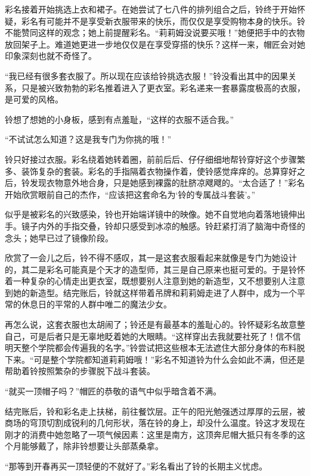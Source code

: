 彩名接着开始挑选上衣和裙子。在她尝试了七八件的排列组合之后，铃终于开始怀疑，彩名有可能并不是享受新衣服带来的快乐，而仅仅是享受购物本身的快乐。铃不能赞同这样的观念；她上前提醒彩名。“莉莉姆没说要买哦！”她便把手中的衣物放回架子上。难道她更进一步地仅仅是在享受穿搭的快乐？这样一来，帽匠会对她印象深刻也就不奇怪了。

“我已经有很多套衣服了。所以现在应该给铃挑选衣服！”铃没看出其中的因果关系，只是被兴致勃勃的彩名推着进入了更衣室。彩名递来一套暴露度极高的衣服，是可爱的风格。

铃想了想她的小身板，感到有点羞耻，“这样的衣服不适合我。”

“不试试怎么知道？这是我专门为你挑的哦！”

铃只好接过衣服。彩名绕着她转着圈，前前后后、仔仔细细地帮铃穿好这个步骤繁多、装饰复杂的套装。彩名的手指隔着衣物操作着，使铃感觉痒痒的。总算穿好之后，铃发现衣物意外地合身，只是她感到裸露的肚脐凉飕飕的。“太合适了！”彩名开始欣赏眼前自己的杰作，“应该把这套命名为‘铃的专属战斗套装’。”

似乎是被彩名的兴致感染，铃也开始端详镜中的映像。她不自觉地向着落地镜伸出手。镜子内外的手指交叠，铃却只感受到冰凉的触感。铃赶紧打消了脑海中奇怪的念头；她早已过了镜像阶段。

\begin{branch}
\gutend 欣赏了一会儿之后，铃不得不感叹，其一是这套衣服看起来就像是专门为她设计的，其二是彩名可能真是个天才的造型师，其三是自己原来也挺可爱的。于是铃怀着一种复杂的心情走出更衣室，既想要别人注意到她的新造型，又不想要别人注意到她的新造型。结完账后，铃就这样带着吊牌和莉莉姆走进了人群中，成为一个平常的休息日的平常的人群中唯二的魔法少女。
\end{branch}

再怎么说，这套衣服也太胡闹了；铃还是有最基本的羞耻心的。铃怀疑彩名故意整自己，可是后者只是无辜地眨着她的大眼睛。“这样穿出去我就要社死了！信不信明天整个学院都会传遍我的名字。”铃尝试把这些根本无法遮住大部分身体的布料脱下来。“可是整个学院都知道莉莉姆哦！”彩名不知道铃为什么会如此不满，但还是帮助着铃按照繁杂的步骤脱下战斗套装。

“就买一顶帽子吗？”帽匠的恭敬的语气中似乎暗含着不满。

结完账后，铃和彩名走上扶梯，前往餐饮层。正午的阳光勉强透过厚厚的云层，被商场的穹顶切割成锐利的几何形状，落在铃的身上，却没什么温度。铃这才发现在刚才的消费中她忽略了一项气候因素：这里是南方，这顶奔尼帽大抵只有冬季的这个月能够戴了，除非铃想要让头部蒸桑拿。

“那等到开春再买一顶轻便的不就好了。”彩名看出了铃的长期主义忧虑。

